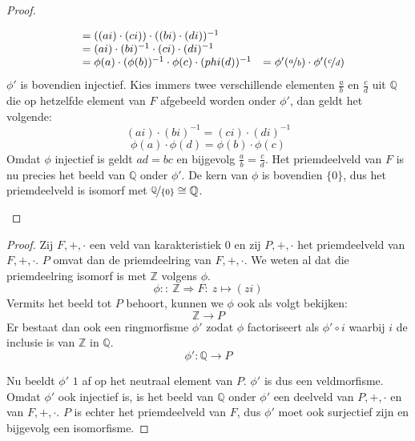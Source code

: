 \documentclass[main.tex]{subfiles}
\begin{document}
\begin{st}
\begin{proof}
\begin{itemize}
\[\begin{array}{rll}
                                                     &= ((ai) \cdot (ci)) \cdot ((bi) \cdot (di))^{-1} &\\
                                                     &= (ai) \cdot (bi)^{-1} \cdot (ci) \cdot (di)^{-1} &\\
                                                     &= \phi(a) \cdot (\phi(b))^{-1} \cdot \phi(c) \cdot (phi(d))^{-1} &= \phi'(\nicefrac{a}{b}) \cdot \phi'(\nicefrac{c}{d})
      \end{array}
      \]
      $\phi'$ is bovendien injectief.  Kies immers twee verschillende
      elementen $\frac{a}{b}$ en $\frac{c}{d}$ uit $\mathbb{Q}$ die op
      hetzelfde element van $F$ afgebeeld worden onder $\phi'$, dan
      geldt het volgende:
      \[ (ai) \cdot (bi)^{-1} = (ci) \cdot (di)^{-1} \]
      \[ \phi(a) \cdot \phi(d) = \phi(b) \cdot \phi(c) \]
      Omdat $\phi$ injectief is geldt $ad = bc$ en bijgevolg
      $\frac{a}{b} = \frac{c}{d}$.
      Het priemdeelveld van $F$ is nu precies het beeld van $\mathbb{Q}$ onder $\phi'$. \waarom
      De kern van $\phi$ is bovendien $\{0\}$, dus het priemdeelveld is isomorf met $\nicefrac{\mathbb{Q}}{\{0\}} \cong \mathbb{Q}$.
    \end{itemize}
  \end{proof}
  \begin{proof}
    Zij $F,+,\cdot$ een veld van karakteristiek $0$ en zij $P,+,\cdot$ het priemdeelveld van $F,+,\cdot$.
    $P$ omvat dan de priemdeelring van $F,+,\cdot$.
    We weten al dat die priemdeelring isomorf is met $\mathbb{Z}$ volgens $\phi$.
    \[ \phi::\ \mathbb{Z} \Rightarrow F:\ z \mapsto (zi)\]
    Vermits het beeld tot $P$ behoort, kunnen we $\phi$ ook als volgt bekijken:
    \[ \mathbb{Z} \rightarrow P \]
    Er bestaat dan ook een ringmorfisme $\phi'$ zodat $\phi$ factoriseert als $\phi' \circ i$ waarbij $i$ de inclusie is van $\mathbb{Z}$ in $\mathbb{Q}$. 
    \[ \phi': \mathbb{Q} \rightarrow P \]
    \begin{figure}[H]
      \centering
    \end{figure}
    Nu beeldt $\phi'$ $1$ af op het neutraal element van $P$.
    $\phi'$ is dus een veldmorfisme.
    Omdat $\phi'$ ook injectief is, is het beeld van $\mathbb{Q}$ onder $\phi'$ een deelveld van $P,+,\cdot$ en van $F,+,\cdot$.
    $P$ is echter het priemdeelveld van $F$, dus $\phi'$ moet ook surjectief zijn en bijgevolg een isomorfisme.
  \end{proof}
\end{st}
\end{document}
